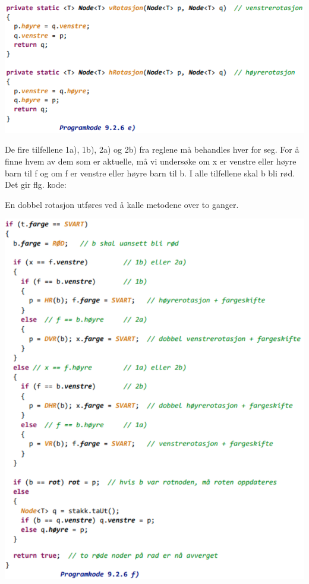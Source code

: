 \documentclass[11pt]{article}
\begin{document}
        \includegraphics[center]{pk-9.2.6e.png}

        De fire tilfellene 1a), 1b), 2a) og 2b) fra reglene må behandles hver for seg. For å finne hvem
        av dem som er aktuelle, må vi undersøke om x er venstre eller høyre barn til f og om f er
        venstre eller høyre barn til b. I alle tilfellene skal b bli rød. Det gir flg. kode:

        En dobbel rotasjon utføres ved å kalle metodene over to ganger.

        \includegraphics[center]{pk-9.2.6f.png}
\end{document}
